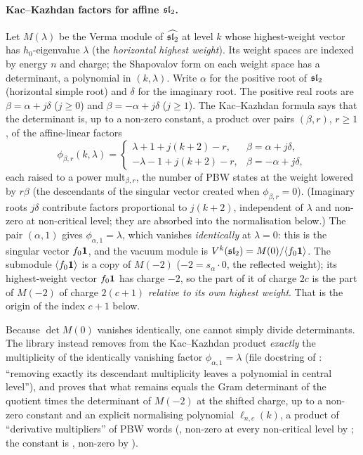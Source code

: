\paragraph{Kac--Kazhdan factors for affine $\mathfrak{sl}_2$.} Let $M(\lambda)$ be the Verma module of
$\widehat{\mathfrak{sl}_2}$ at level $k$ whose highest-weight vector has $h_0$-eigenvalue $\lambda$ (the
\emph{horizontal highest weight}). Its weight spaces are indexed by energy $n$ and charge; the Shapovalov form
on each weight space has a determinant, a polynomial in $(k,\lambda)$. Write $\alpha$ for the positive root of
$\mathfrak{sl}_2$ (horizontal simple root) and $\delta$ for the imaginary root. The positive real roots are
$\beta=\alpha+j\delta$ ($j\ge0$) and $\beta=-\alpha+j\delta$ ($j\ge1$). The Kac--Kazhdan formula says that the
determinant is, up to a non-zero constant, a product over pairs $(\beta,r)$, $r\ge1$, of the affine-linear factors
\begin{equation*}
\phi_{\beta,r}(k,\lambda)=\begin{cases}\lambda+1+j(k+2)-r,&\beta=\alpha+j\delta,\\
-\lambda-1+j(k+2)-r,&\beta=-\alpha+j\delta,\end{cases}
\end{equation*}
each raised to a power $\mathrm{mult}_{\beta,r}$, the number of PBW states at the weight lowered by $r\beta$ (the
descendants of the singular vector created when $\phi_{\beta,r}=0$). (Imaginary roots $j\delta$ contribute factors
proportional to $j(k+2)$, independent of $\lambda$ and non-zero at non-critical level; they are absorbed into the
normalisation below.) The pair
$(\alpha,1)$ gives $\phi_{\alpha,1}=\lambda$, which vanishes \emph{identically} at $\lambda=0$: this is the
singular vector $f_0\mathbf{1}$, and the vacuum module is $V^k(\mathfrak{sl}_2)=M(0)/\langle f_0\mathbf{1}\rangle$.
The submodule $\langle f_0\mathbf{1}\rangle$ is a copy of $M(-2)$ ($-2=s_\alpha\cdot0$, the reflected weight); its
highest-weight vector $f_0\mathbf{1}$ has charge $-2$, so the part of it of charge $2c$ is the part of $M(-2)$
of charge $2(c+1)$ \emph{relative to its own highest weight}. That is the origin of the index $c+1$ below.

Because $\det M(0)$ vanishes identically, one cannot simply divide determinants. The library instead removes from
the Kac--Kazhdan product \emph{exactly} the multiplicity of the identically vanishing factor $\phi_{\alpha,1}=\lambda$
(file docstring of : ``removing exactly its descendant multiplicity leaves a
polynomial in central level''), and proves that what remains equals the Gram determinant of the quotient times the
determinant of $M(-2)$ at the shifted charge, up to a non-zero constant and an explicit normalising polynomial
$\ell_{n,c}(k)$, a product of ``derivative multipliers'' of PBW words (, non-zero at every
non-critical level by
; the constant is , non-zero by
).

